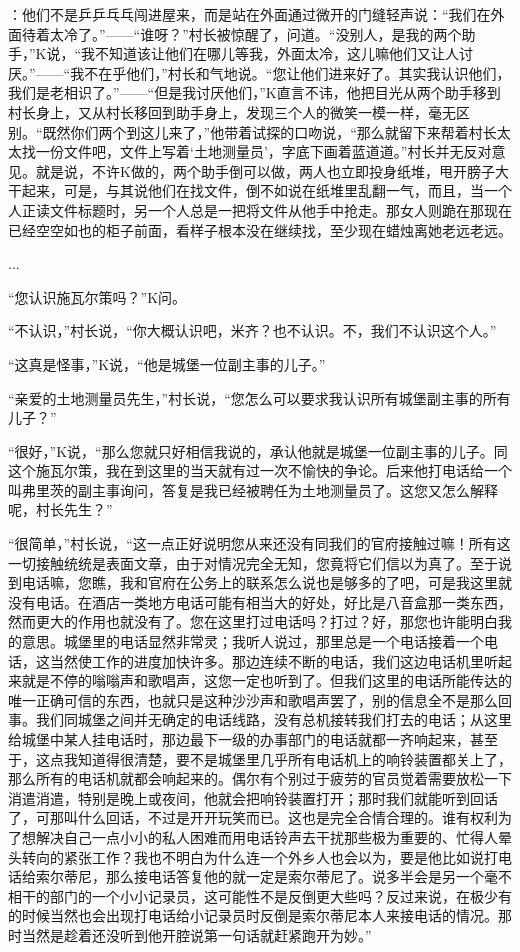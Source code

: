 \documentclass[12pt,a4paper]{article}
\begin{document}
：他们不是乒乒乓乓闯进屋来，而是站在外面通过微开的门缝轻声说：“我们在外面待着太冷了。”——“谁呀？”村长被惊醒了，问道。“没别人，是我的两个助手，”K说，“我不知道该让他们在哪儿等我，外面太冷，这儿嘛他们又让人讨厌。”——“我不在乎他们，”村长和气地说。“您让他们进来好了。其实我认识他们，我们是老相识了。”——“但是我讨厌他们，”K直言不讳，他把目光从两个助手移到村长身上，又从村长移回到助手身上，发现三个人的微笑一模一样，毫无区别。“既然你们两个到这儿来了，”他带着试探的口吻说，“那么就留下来帮着村长太太找一份文件吧，文件上写着‘土地测量员’，字底下画着蓝道道。”村长并无反对意见。就是说，不许K做的，两个助手倒可以做，两人也立即投身纸堆，甩开膀子大干起来，可是，与其说他们在找文件，倒不如说在纸堆里乱翻一气，而且，当一个人正读文件标题时，另一个人总是一把将文件从他手中抢走。那女人则跪在那现在已经空空如也的柜子前面，看样子根本没在继续找，至少现在蜡烛离她老远老远。



...



“您认识施瓦尔策吗？”K问。

“不认识，”村长说，“你大概认识吧，米齐？也不认识。不，我们不认识这个人。”

“这真是怪事，”K说，“他是城堡一位副主事的儿子。”

“亲爱的土地测量员先生，”村长说，“您怎么可以要求我认识所有城堡副主事的所有儿子？”

“很好，”K说，“那么您就只好相信我说的，承认他就是城堡一位副主事的儿子。同这个施瓦尔策，我在到这里的当天就有过一次不愉快的争论。后来他打电话给一个叫弗里茨的副主事询问，答复是我已经被聘任为土地测量员了。这您又怎么解释呢，村长先生？”

“很简单，”村长说，“这一点正好说明您从来还没有同我们的官府接触过嘛！所有这一切接触统统是表面文章，由于对情况完全无知，您竟将它们信以为真了。至于说到电话嘛，您瞧，我和官府在公务上的联系怎么说也是够多的了吧，可是我这里就没有电话。在酒店一类地方电话可能有相当大的好处，好比是八音盒那一类东西，然而更大的作用也就没有了。您在这里打过电话吗？打过？好，那您也许能明白我的意思。城堡里的电话显然非常灵；我听人说过，那里总是一个电话接着一个电话，这当然使工作的进度加快许多。那边连续不断的电话，我们这边电话机里听起来就是不停的嗡嗡声和歌唱声，这您一定也听到了。但我们这里的电话所能传达的唯一正确可信的东西，也就只是这种沙沙声和歌唱声罢了，别的信息全不是那么回事。我们同城堡之间并无确定的电话线路，没有总机接转我们打去的电话；从这里给城堡中某人挂电话时，那边最下一级的办事部门的电话就都一齐响起来，甚至于，这点我知道得很清楚，要不是城堡里几乎所有电话机上的响铃装置都关上了，那么所有的电话机就都会响起来的。偶尔有个别过于疲劳的官员觉着需要放松一下消遣消遣，特别是晚上或夜间，他就会把响铃装置打开；那时我们就能听到回话了，可那叫什么回话，不过是开开玩笑而已。这也是完全合情合理的。谁有权利为了想解决自己一点小小的私人困难而用电话铃声去干扰那些极为重要的、忙得人晕头转向的紧张工作？我也不明白为什么连一个外乡人也会以为，要是他比如说打电话给索尔蒂尼，那么接电话答复他的就一定是索尔蒂尼了。说多半会是另一个毫不相干的部门的一个小小记录员，这可能性不是反倒更大些吗？反过来说，在极少有的时候当然也会出现打电话给小记录员时反倒是索尔蒂尼本人来接电话的情况。那时当然是趁着还没听到他开腔说第一句话就赶紧跑开为妙。”
\par{}
\newpage
\end{document}
